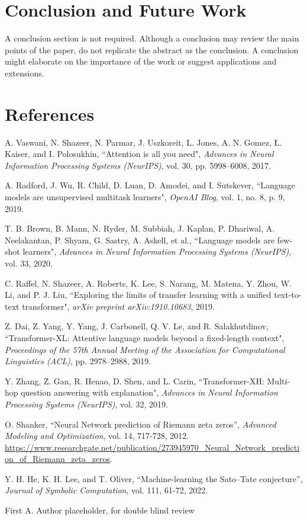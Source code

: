 \documentclass[journal]{IEEEtai}
\begin{document}
\section{Conclusion and Future Work}

A conclusion section is not required. Although a conclusion may review the main points of the paper, do not replicate the abstract as the conclusion. A conclusion might elaborate on the importance of the work or suggest applications and extensions.






\section*{References}

\begin{thebibliography}{34}

A. Vaswani, N. Shazeer, N. Parmar, J. Uszkoreit, L. Jones, A. N. Gomez, Ł. Kaiser, and I. Polosukhin, ``Attention is all you need",  \emph{Advances in Neural Information Processing Systems (NeurIPS)}, vol. 30, pp. 5998--6008, 2017.

A. Radford, J. Wu, R. Child, D. Luan, D. Amodei, and I. Sutskever, ``Language models are unsupervised multitask learners", \emph{OpenAI Blog}, vol. 1, no. 8, p. 9, 2019.

T. B. Brown, B. Mann, N. Ryder, M. Subbiah, J. Kaplan, P. Dhariwal, A. Neelakantan, P. Shyam, G. Sastry, A. Askell, et al., ``Language models are few-shot learners",  \emph{Advances in Neural Information Processing Systems (NeurIPS)}, vol. 33, 2020.

C. Raffel, N. Shazeer, A. Roberts, K. Lee, S. Narang, M. Matena, Y. Zhou, W. Li, and P. J. Liu, ``Exploring the limits of transfer learning with a unified text-to-text transformer", \emph{arXiv preprint arXiv:1910.10683}, 2019.

Z. Dai, Z. Yang, Y. Yang, J. Carbonell, Q. V. Le, and R. Salakhutdinov, ``Transformer-XL: Attentive language models beyond a fixed-length context",  \emph{Proceedings of the 57th Annual Meeting of the Association for Computational Linguistics (ACL)}, pp. 2978--2988, 2019.

Y. Zhang, Z. Gan, R. Henao, D. Shen, and L. Carin, ``Transformer-XH: Multi-hop question answering with explanation",  \emph{Advances in Neural Information Processing Systems (NeurIPS)}, vol. 32, 2019.

 O. Shanker, ``Neural Network prediction of Riemann zeta zeros'',
\emph{Advanced Modeling and Optimization}, vol. 14, 717-728, 2012. \url{https://www.researchgate.net/publication/273945970_Neural_Network_prediction_of_Riemann_zeta_zeros}.

 Y. H. He, K. H. Lee, and T. Oliver, ``Machine-learning the Sato–Tate conjecture'', \emph{Journal of Symbolic Computation}, vol. 111, 61-72, 2022.

\end{thebibliography}






\begin{IEEEbiography}{First A. Author}{\space}   placeholder, for double blind review
\end{IEEEbiography}
\end{document}
